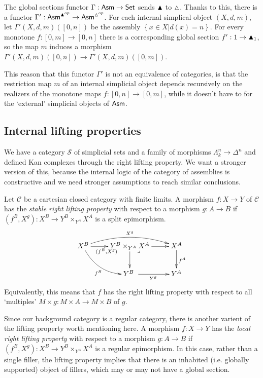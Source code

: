 \documentclass{amsart}
\theoremstyle{plain}
\theoremstyle{definition}
\newcommand\hide[1]{}
\newcommand\cat\mathcal
\newcommand\set[1]{\left\{#1\right\}}
\begin{document}
The global sections functor $\Gamma:\mathsf{Asm}\to\mathsf{Set}$ sends $\blacktriangle$ to $\vartriangle$. Thanks to this, there is a functor $\Gamma':\mathsf{Asm}^{\blacktriangle^{op}} \to \mathsf{Asm}^{\vartriangle^{op}}$. For each internal simplical object $(X,d,m)$, let $\Gamma'(X,d,m)([0,n])$ be the assembly $\set{x\in X|d(x)=n}$. For every monotone $f:[0,m]\to [0,n]$ there is a corresponding global section $f':1\to \blacktriangle_1$, so the map $m$ induces a morphism $\Gamma'(X,d,m)([0,n]) \to \Gamma'(X,d,m)([0,m])$.

This reason that this functor $\Gamma'$ is not an equivalence of categories, is that the restriction map $m$ of an internal simplicial object depends recursively on the realizers of the monotone maps $f:[0,n]\to [0,m]$, while it doesn't have to for the `external' simplicial objects of $\mathsf{Asm}$. \hide{tegenvoorbeeld?}

\subsection{Internal lifting properties}
We have a category $\cat S$ of simplicial sets and a family of morphisms $\Lambda^n_k\to\Delta^n$ and defined Kan complexes through the right lifting property. We want a stronger version of this, because the internal logic of the category of assemblies is constructive and we need stronger assumptions to reach similar conclusions.

\newcommand\pb{\ar@{}[dr]|<\lrcorner}
Let $\cat C$ be a cartesian closed category with finite limits. A morphism $f:X\to Y$ of $\cat C$ has the \emph{stable right lifting property} with respect to a morphism $g:A\to B$ if $(f^B,X^g): X^B \to Y^B\times_{Y^A} X^A$ is a split epimorphism.
\[\xymatrix{
X^B\ar@/_3ex/[dr]_{f^B} \ar@/^3ex/[rr]^{X^g} \ar[r]_{(f^B,X^g)}
&Y^B\times_{Y^A} X^A \ar[r]\ar[d]\pb & X^A \ar[d]^{f^A} \\
&Y^B\ \ar[r]_{Y^g} & Y^A \\
}\]
Equivalently, this means that $f$ has the right lifting property with respect to all `multiples' $M\times g:M\times A\to M\times B$ of $g$. 

Since our background category is a regular category, there is another varient of the lifting property worth mentioning here. A morphism $f:X\to Y$ has the \emph{local right lifting property} with respect to a morphism $g:A\to B$ if $(f^B,X^g): X^B \to Y^B\times_{Y^A} X^A$ is a regular epimorphism. In this case, rather than a single filler, the lifting property implies that there is an inhabited (i.e. globally supported) object of fillers, which may or may not have a global section. \hide{misschien uitlichten voor refereren later?}
\end{document}
